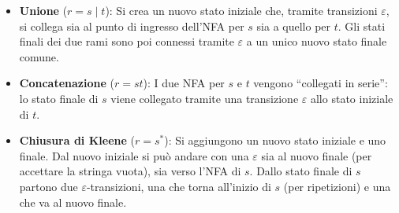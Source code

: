 \begin{itemize}
  \item \textbf{Unione} ($r = s \mid t$):  
    Si crea un nuovo stato iniziale che, tramite transizioni $\varepsilon$, si collega sia al punto di ingresso dell'NFA per $s$ sia a quello per $t$. Gli stati finali dei due rami sono poi connessi tramite $\varepsilon$ a un unico nuovo stato finale comune.
    
    \begin{center}
    \end{center}
  
  \item \textbf{Concatenazione} ($r = st$):  
    I due NFA per $s$ e $t$ vengono “collegati in serie”: lo stato finale di $s$ viene collegato tramite una transizione $\varepsilon$ allo stato iniziale di $t$.
    
    \begin{center}
    \end{center}
  
  \item \textbf{Chiusura di Kleene} ($r = s^*$):  
    Si aggiungono un nuovo stato iniziale e uno finale. Dal nuovo iniziale si può andare con una $\varepsilon$ sia al nuovo finale (per accettare la stringa vuota), sia verso l'NFA di $s$. Dallo stato finale di $s$ partono due $\varepsilon$-transizioni, una che torna all'inizio di $s$ (per ripetizioni) e una che va al nuovo finale.
    

\end{itemize}
